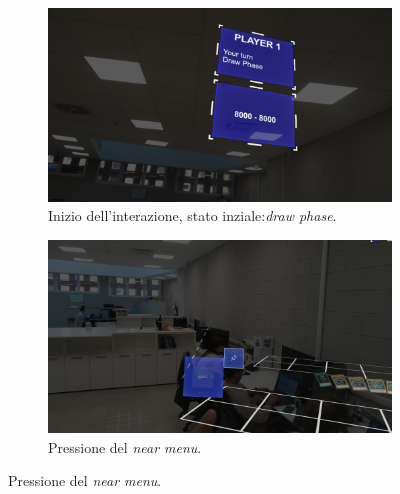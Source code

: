 \begin{figure}
    \centering

    \begin{subfigure}{0.8\textwidth}
        \centering
        \includegraphics[width=\linewidth]{images/interazione1.jpg}
        \caption{Inizio dell'interazione, stato inziale:\textit{draw phase}.}
        \label{fig:interazione1.jpg}
    \end{subfigure}

    \vspace{1cm} %

    \begin{subfigure}{0.8\textwidth}
        \centering
        \includegraphics[width=\linewidth]{images/nearMenu.jpg}
        \caption{Pressione del \textit{near menu}.}
        \label{fig:nearMenu.jpg}
    \end{subfigure}

    \vspace{1cm} %


\end{figure}
